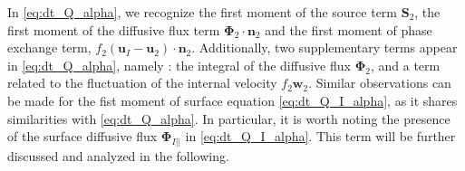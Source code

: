 In \ref{eq:dt_Q_alpha}, we recognize the first moment of the source term $\textbf{S}_2$, the first moment of the diffusive flux term $\mathbf{\Phi}_2\cdot\textbf{n}_2$ and the first moment of phase exchange term, $f_2 (\textbf{u}_I-\textbf{u}_2)\cdot\textbf{n}_2$. 
Additionally, two supplementary terms appear in \ref{eq:dt_Q_alpha}, namely : the integral of the diffusive flux $\mathbf{\Phi}_2$, and a term related to the fluctuation of the internal velocity $f_2 \textbf{w}_2$.
Similar observations can be made for the fist moment of surface equation \ref{eq:dt_Q_I_alpha}, as it shares similarities with \ref{eq:dt_Q_alpha}. 
In particular, it is worth noting the presence of the surface diffusive flux $\mathbf{\Phi}_{I||}$ in \ref{eq:dt_Q_I_alpha}.
This term will be further discussed and analyzed in the following. 


